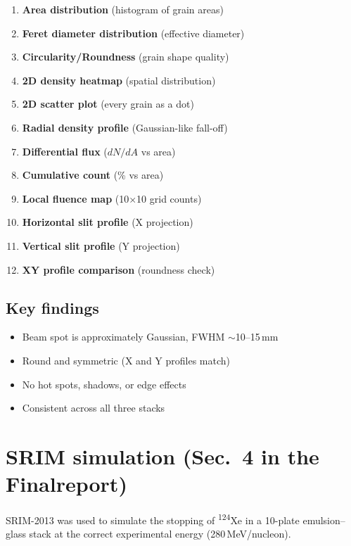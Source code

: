 \documentclass[12pt,a4paper]{article}
\begin{document}
\begin{enumerate}
  \item \textbf{Area distribution} (histogram of grain areas)
  \item \textbf{Feret diameter distribution} (effective diameter)
  \item \textbf{Circularity/Roundness} (grain shape quality)
  \item \textbf{2D density heatmap} (spatial distribution)
  \item \textbf{2D scatter plot} (every grain as a dot)
  \item \textbf{Radial density profile} (Gaussian-like fall-off)
  \item \textbf{Differential flux} ($dN/dA$ vs area)
  \item \textbf{Cumulative count} (\% vs area)
  \item \textbf{Local fluence map} (10$\times$10 grid counts)
  \item \textbf{Horizontal slit profile} (X projection)
  \item \textbf{Vertical slit profile} (Y projection)
  \item \textbf{XY profile comparison} (roundness check)
\end{enumerate}

\subsection{Key findings}

\begin{itemize}
  \item Beam spot is approximately Gaussian, FWHM $\sim$10--15\,mm
  \item Round and symmetric (X and Y profiles match)
  \item No hot spots, shadows, or edge effects
  \item Consistent across all three stacks
\end{itemize}

\section{SRIM simulation (Sec.~4 in the Finalreport)}

SRIM-2013 was used to simulate the stopping of
\textsuperscript{124}Xe in a 10-plate emulsion--glass stack at the
correct experimental energy (280\,MeV/nucleon).
\end{document}
